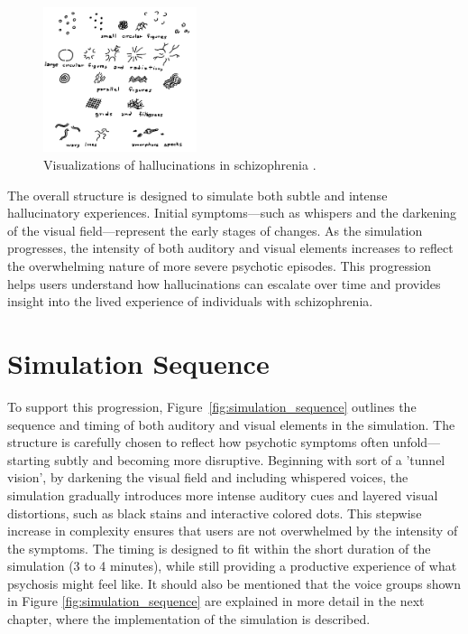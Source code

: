 \begin{figure}[h!] 
    \centering 
    \includegraphics[width=0.4\textwidth]{../../Figures/hallucinations-visual.jpg} 
    \caption{Visualizations of hallucinations in schizophrenia \cite{Horowitz1964}.} 
    \label{fig:visualizations_hallucinations} 
\end{figure}


The overall structure is designed to simulate both subtle and intense hallucinatory experiences. Initial symptoms—such as whispers and the darkening of the visual field—represent the early stages of changes. As the simulation progresses, the intensity of both auditory and visual elements increases to reflect the overwhelming nature of more severe psychotic episodes. This progression helps users understand how hallucinations can escalate over time and provides insight into the lived experience of individuals with schizophrenia.

\section{Simulation Sequence}

To support this progression, Figure~\ref{fig:simulation_sequence} outlines the sequence and timing of both auditory and visual elements in the simulation. The structure is carefully chosen to reflect how psychotic symptoms often unfold—starting subtly and becoming more disruptive. Beginning with sort of a 'tunnel vision', by darkening the visual field and including whispered voices, the simulation gradually introduces more intense auditory cues and layered visual distortions, such as black stains and interactive colored dots. This stepwise increase in complexity ensures that users are not overwhelmed by the intensity of the symptoms. The timing is designed to fit within the short duration of the simulation (3 to 4 minutes), while still providing a productive experience of what psychosis might feel like. It should also be mentioned that the voice groups shown in Figure \ref{fig:simulation_sequence} are explained in more detail in the next chapter, where the implementation of the simulation is described.

